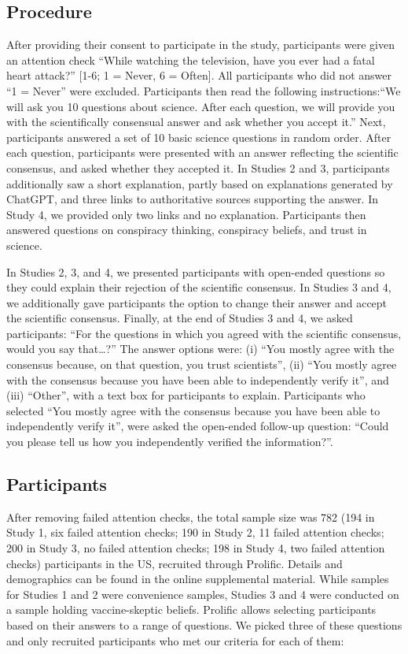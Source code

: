 \documentclass[
  doc,floatsintext]{apa6}
\begin{document}
\subsection{Procedure}\label{procedure}

After providing their consent to participate in the study, participants were given an attention check ``While watching the television, have you ever had a fatal heart attack?'' {[}1-6; 1 = Never, 6 = Often{]}. All participants who did not answer ``1 = Never'' were excluded. Participants then read the following instructions:``We will ask you 10 questions about science. After each question, we will provide you with the scientifically consensual answer and ask whether you accept it.'' Next, participants answered a set of 10 basic science questions in random order. After each question, participants were presented with an answer reflecting the scientific consensus, and asked whether they accepted it. In Studies 2 and 3, participants additionally saw a short explanation, partly based on explanations generated by ChatGPT, and three links to authoritative sources supporting the answer. In Study 4, we provided only two links and no explanation. Participants then answered questions on conspiracy thinking, conspiracy beliefs, and trust in science.

In Studies 2, 3, and 4, we presented participants with open-ended questions so they could explain their rejection of the scientific consensus. In Studies 3 and 4, we additionally gave participants the option to change their answer and accept the scientific consensus. Finally, at the end of Studies 3 and 4, we asked participants: ``For the questions in which you agreed with the scientific consensus, would you say that\ldots?'' The answer options were: (i) ``You mostly agree with the consensus because, on that question, you trust scientists'', (ii) ``You mostly agree with the consensus because you have been able to independently verify it'', and (iii) ``Other'', with a text box for participants to explain. Participants who selected ``You mostly agree with the consensus because you have been able to independently verify it'', were asked the open-ended follow-up question: ``Could you please tell us how you independently verified the information?''.

\subsection{Participants}\label{participants}

After removing failed attention checks, the total sample size was 782 (194 in Study 1, six failed attention checks; 190 in Study 2, 11 failed attention checks; 200 in Study 3, no failed attention checks; 198 in Study 4, two failed attention checks) participants in the US, recruited through Prolific. Details and demographics can be found in the online supplemental material. While samples for Studies 1 and 2 were convenience samples, Studies 3 and 4 were conducted on a sample holding vaccine-skeptic beliefs. Prolific allows selecting participants based on their answers to a range of questions. We picked three of these questions and only recruited participants who met our criteria for each of them:
\end{document}
